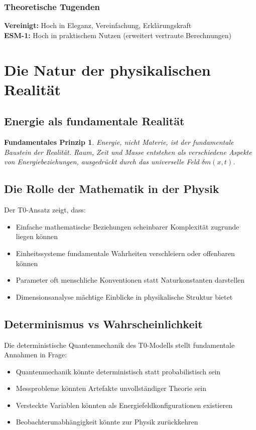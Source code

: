 \documentclass[12pt,a4paper]{report}
\newtheorem{principle}{Fundamentales Prinzip}[chapter]
\begin{document}
	\subsubsection{Theoretische Tugenden}
	\textbf{Vereinigt:} Hoch in Eleganz, Vereinfachung, Erklärungskraft\\
	\textbf{ESM-1:} Hoch in praktischem Nutzen (erweitert vertraute Berechnungen)
	
	\section{Die Natur der physikalischen Realität}
	
	\subsection{Energie als fundamentale Realität}
	\begin{principle}
		Energie, nicht Materie, ist der fundamentale Baustein der Realität. Raum, Zeit und Masse entstehen als verschiedene Aspekte von Energiebeziehungen, ausgedrückt durch das universelle Feld $\delta m(x,t)$.
	\end{principle}
	
	\subsection{Die Rolle der Mathematik in der Physik}
	Der T0-Ansatz zeigt, dass:
	\begin{itemize}
		\item Einfache mathematische Beziehungen scheinbarer Komplexität zugrunde liegen können
		\item Einheitssysteme fundamentale Wahrheiten verschleiern oder offenbaren können
		\item Parameter oft menschliche Konventionen statt Naturkonstanten darstellen
		\item Dimensionsanalyse mächtige Einblicke in physikalische Struktur bietet
	\end{itemize}
	
	\subsection{Determinismus vs Wahrscheinlichkeit}
	Die deterministische Quantenmechanik des T0-Modells stellt fundamentale Annahmen in Frage:
	\begin{itemize}
		\item Quantenmechanik könnte deterministisch statt probabilistisch sein
		\item Messprobleme könnten Artefakte unvollständiger Theorie sein
		\item Versteckte Variablen könnten als Energiefeldkonfigurationen existieren
		\item Beobachterunabhängigkeit könnte zur Physik zurückkehren
	\end{itemize}
	
\end{document}

